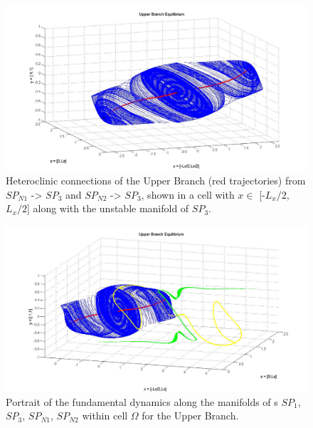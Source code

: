 \documentclass[letter,12pt,openany]{article}
\begin{document}
    \begin{figure}[!h]
\includegraphics[width=1.0\textwidth]{man14_june3.jpg}
  \caption{
   Heteroclinic connections of the Upper Branch (red trajectories) from $SP_{N1}$ -> $SP_3$ and $SP_{N2}$ -> $SP_3$, shown in a cell with $x \in$ [-$L_x/2$, $L_x/2$] along with the unstable manifold of $SP_3$.
   }
  \label{eltonFig:hetero1}
 \end{figure}




  \begin{figure}[!h]
\includegraphics[width=1.1\textwidth]{june4_fig7.jpg}
  \caption{
   Portrait of the fundamental dynamics along the manifolds of \stagp s $SP_1$, $SP_3$, $SP_{N1}$, $SP_{N2}$ within cell $\Omega$ for the Upper Branch.
   }
  \label{eltonFig:hetero2}
 \end{figure}


 
\end{document}
